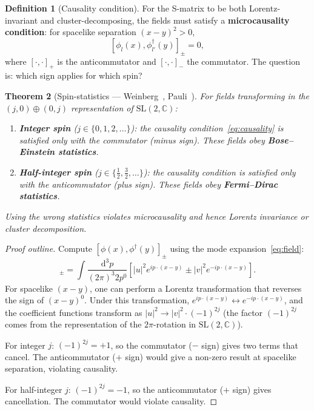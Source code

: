 \documentclass[12pt]{article}
\theoremstyle{plain}
\newtheorem{theorem}{Theorem}[section]
\theoremstyle{definition}
\newtheorem{definition}[theorem]{Definition}
\theoremstyle{remark}
\newcommand{\SL}{\mathrm{SL}}
\newcommand{\dd}{\mathrm{d}}
\begin{document}
\begin{definition}[Causality condition]\label{def:causality}
For the S-matrix to be both Lorentz-invariant and cluster-decomposing, the fields must satisfy a \textbf{microcausality condition}: for spacelike separation $(x - y)^2 > 0$,
\begin{equation}\label{eq:causality}
[\phi_l(x), \phi_{l'}^\dagger(y)]_\pm = 0,
\end{equation}
where $[\cdot, \cdot]_+$ is the anticommutator and $[\cdot, \cdot]_-$ the commutator. The question is: which sign applies for which spin?
\end{definition}

\begin{theorem}[Spin-statistics --- Weinberg~\cite{weinberg1995}, Pauli~\cite{pauli1940}]\label{thm:spinstat}
For fields transforming in the $(j, 0) \oplus (0, j)$ representation of $\SL(2, \mathbb{C})$:
\begin{enumerate}[label=(\alph*)]
    \item \textbf{Integer spin} ($j \in \{0, 1, 2, \ldots\}$): the causality condition~\eqref{eq:causality} is satisfied only with the \emph{commutator} (minus sign). These fields obey \textbf{Bose--Einstein statistics}.
    \item \textbf{Half-integer spin} ($j \in \{\frac{1}{2}, \frac{3}{2}, \ldots\}$): the causality condition is satisfied only with the \emph{anticommutator} (plus sign). These fields obey \textbf{Fermi--Dirac statistics}.
\end{enumerate}
Using the wrong statistics violates microcausality and hence Lorentz invariance or cluster decomposition.
\end{theorem}

\begin{proof}[Proof outline]
Compute $[\phi(x), \phi^\dagger(y)]_\pm$ using the mode expansion~\eqref{eq:field}:
\begin{equation}
[\phi(x), \phi^\dagger(y)]_\pm = \int \frac{\dd^3p}{(2\pi)^3 2p^0}\left[|u|^2 e^{ip\cdot(x-y)} \pm |v|^2 e^{-ip\cdot(x-y)}\right].
\end{equation}
For spacelike $(x-y)$, one can perform a Lorentz transformation that reverses the sign of $(x-y)^0$. Under this transformation, $e^{ip\cdot(x-y)} \leftrightarrow e^{-ip\cdot(x-y)}$, and the coefficient functions transform as $|u|^2 \to |v|^2 \cdot (-1)^{2j}$ (the factor $(-1)^{2j}$ comes from the representation of the $2\pi$-rotation in $\SL(2, \mathbb{C})$).

For integer $j$: $(-1)^{2j} = +1$, so the commutator ($-$ sign) gives two terms that cancel. The anticommutator ($+$ sign) would give a non-zero result at spacelike separation, violating causality.

For half-integer $j$: $(-1)^{2j} = -1$, so the anticommutator ($+$ sign) gives cancellation. The commutator would violate causality.
\end{proof}
\end{document}
